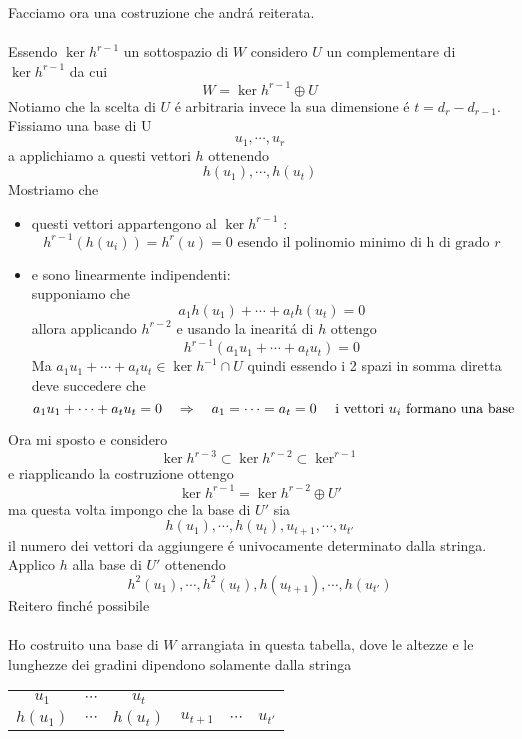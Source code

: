 \begin{thm}
Facciamo ora una costruzione che andr\'a reiterata.\\ \\ 
Essendo $\ker h^{r-1} $ un sottospazio di $W $ considero $U$ un complementare di $\ker h^{r-1}$ da cui
$$ W= \ker h^{r-1} \oplus U $$
Notiamo che la scelta di $U$ \'e arbitraria invece la sua dimensione \'e $t=d_r-d_{r-1}$.\\
Fissiamo una base  di U 
$$ u_1 , \cdots , u_r $$
a applichiamo a questi vettori $h$ ottenendo
$$ h(u_1),\cdots , h(u_t)$$
Mostriamo che 
\begin{itemize} \item questi vettori appartengono al $\ker h^{r-1} $ : 
$$ h^{r-1}(h(u_i))= h^r (u) =0 \text{ esendo il polinomio minimo di h di grado } r $$ \item
e sono linearmente indipendenti:\\
supponiamo che 
$$ a_1 h(u_1) + \cdots + a_t h(u_t)=0 $$
allora applicando $h^{r-2}$ e usando la inearit\'a di $h$ ottengo
$$h^{r-1} (  a_1 u_1  + \cdots+ a_t u_t)=0  $$
Ma $ a_1 u_1 + \cdots + a_t u_t \in \ker h^{-1} \cap U $ quindi essendo i 2 spazi in somma diretta  deve succedere che 
$$  a_1 u_1 + \cdots + a_t u_t =0 \quad \Rightarrow \quad a_1=\cdots=a_t=0 \quad\text{ i vettori } u_i \text{ formano una base } $$ 
\end{itemize}
\spazio
Ora mi sposto e considero 
$$ \ker h^{r-3} \subset \ker h^{r-2} \subset \ker ^{r-1} $$
e riapplicando la costruzione ottengo
$$ \ker h^{r-1} = \ker h^{r-2} \oplus U'$$
ma questa volta impongo che la base di $U'$ sia
$$ h(u_1) , \cdots , h(u_t) , u_{t+1}, \cdots , u_{t'} $$
il numero dei vettori da aggiungere \'e univocamente determinato dalla stringa.\\
Applico $h$ alla base di $U'$ ottenendo
$$ h^2(u_1) , \cdots , h^2(u_t) , h(u_{t+1}), \cdots ,h( u_{t'}) $$
Reitero finch\'e possibile \\
\\
Ho costruito una base di $W$ arrangiata in questa tabella, dove le altezze e le lunghezze dei gradini dipendono solamente dalla stringa\\
\begin{center}
\begin{tabular}{cccccc}

$u_1$ & $\cdots $ & $u_t$ &  &  &  \\ 

$h(u_1) $& $\cdots $&$ h(u_t) $& $u_{t+1}$ & $\cdots$ & $u_{t'} $\\ 


\end{tabular}
\end{center}
\end{thm}
